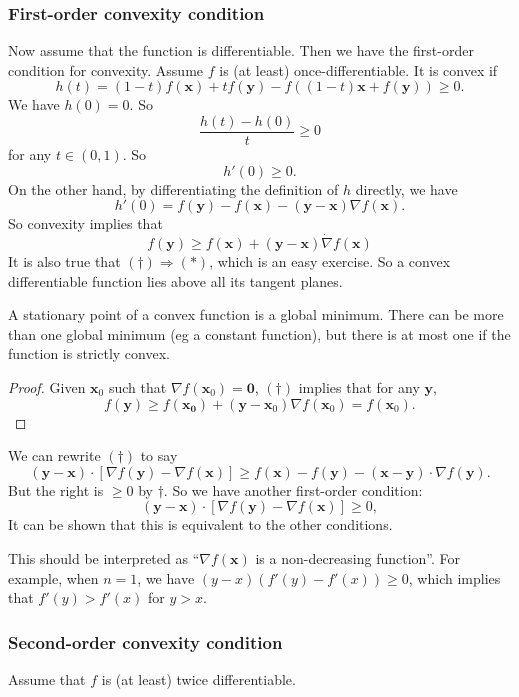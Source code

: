 \documentclass[a4paper]{article}
\begin{document}
\subsubsection{First-order convexity condition}
Now assume that the function is differentiable. Then we have the first-order condition for convexity. Assume $f$ is (at least) once-differentiable. It is convex if
\[
  h(t) = (1 - t)f(\mathbf{x}) + tf(\mathbf{y}) - f((1 - t)\mathbf{x} + f(\mathbf{y})) \geq 0.
\]
We have $h(0) = 0$. So
\[
  \frac{h(t) - h(0)}{t} \geq 0
\]
for any $t\in (0, 1)$. So
\[
  h'(0) \geq 0.
\]
On the other hand, by differentiating the definition of $h$ directly, we have
\[
  h'(0) = f(\mathbf{y}) - f(\mathbf{x}) - (\mathbf{y} - \mathbf{x})\nabla f (\mathbf{x}).
\]
So convexity implies that
\[
  f(\mathbf{y}) \geq f(\mathbf{x}) + (\mathbf{y} - \mathbf{x})\dot \nabla f(\mathbf{x}) \tag{$\dagger$}
\]
It is also true that $(\dagger)\Rightarrow (*)$, which is an easy exercise. So a convex differentiable function lies above all its tangent planes.

\begin{cor}
  A stationary point of a convex function is a global minimum. There can be more than one global minimum (eg a constant function), but there is at most one if the function is strictly convex.
\end{cor}

\begin{proof}
  Given $\mathbf{x}_0$ such that $\nabla f(\mathbf{x}_0) = \mathbf{0}$, $(\dagger)$ implies that for any $\mathbf{y}$,
  \[
    f(\mathbf{y}) \geq f(\mathbf{x_0}) + (\mathbf{y} - \mathbf{x}_0)\nabla f(\mathbf{x}_0) = f(\mathbf{x}_0).
  \]
\end{proof}

We can rewrite $(\dagger)$ to say
\[
  (\mathbf{y} - \mathbf{x}) \cdot [\nabla f(\mathbf{y}) - \nabla f(\mathbf{x})] \geq f(\mathbf{x}) - f(\mathbf{y}) - (\mathbf{x} - \mathbf{y}) \cdot \nabla f(\mathbf{y}).
\]
But the right is $\geq 0$ by $\dagger$. So we have another first-order condition:
\[
  (\mathbf{y} - \mathbf{x})\cdot [\nabla f(\mathbf{y}) - \nabla f(\mathbf{x})]  \geq 0,
\]
It can be shown that this is equivalent to the other conditions.

This should be interpreted as ``$\nabla f(\mathbf{x})$ is a non-decreasing function''. For example, when $n = 1$, we have $(y - x)(f'(y) - f'(x)) \geq 0$, which implies that $f'(y) > f'(x)$ for $y > x$.

\subsubsection{Second-order convexity condition}
Assume that $f$ is (at least) twice differentiable.
\end{document}
